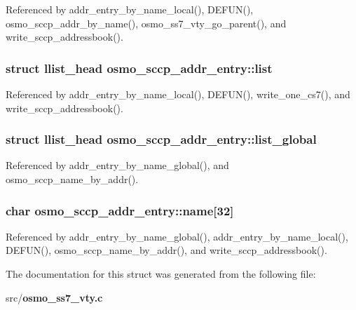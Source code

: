Referenced by addr\+\_\+entry\+\_\+by\+\_\+name\+\_\+local(), D\+E\+F\+U\+N(), osmo\+\_\+sccp\+\_\+addr\+\_\+by\+\_\+name(), osmo\+\_\+ss7\+\_\+vty\+\_\+go\+\_\+parent(), and write\+\_\+sccp\+\_\+addressbook().

\subsubsection[{list}]{\setlength{\rightskip}{0pt plus 5cm}struct llist\+\_\+head osmo\+\_\+sccp\+\_\+addr\+\_\+entry\+::list}\label{structosmo__sccp__addr__entry_a4b37e6e3479ec01f69d9ad791005f8da}


Referenced by addr\+\_\+entry\+\_\+by\+\_\+name\+\_\+local(), D\+E\+F\+U\+N(), write\+\_\+one\+\_\+cs7(), and write\+\_\+sccp\+\_\+addressbook().

\subsubsection[{list\+\_\+global}]{\setlength{\rightskip}{0pt plus 5cm}struct llist\+\_\+head osmo\+\_\+sccp\+\_\+addr\+\_\+entry\+::list\+\_\+global}\label{structosmo__sccp__addr__entry_a8dd093adb27bd599d2b7578aa2c1d615}


Referenced by addr\+\_\+entry\+\_\+by\+\_\+name\+\_\+global(), and osmo\+\_\+sccp\+\_\+name\+\_\+by\+\_\+addr().

\subsubsection[{name}]{\setlength{\rightskip}{0pt plus 5cm}char osmo\+\_\+sccp\+\_\+addr\+\_\+entry\+::name[32]}\label{structosmo__sccp__addr__entry_a20e9fdcbe86f2a18f2a5daabe08f03ff}


Referenced by addr\+\_\+entry\+\_\+by\+\_\+name\+\_\+global(), addr\+\_\+entry\+\_\+by\+\_\+name\+\_\+local(), D\+E\+F\+U\+N(), osmo\+\_\+sccp\+\_\+name\+\_\+by\+\_\+addr(), and write\+\_\+sccp\+\_\+addressbook().



The documentation for this struct was generated from the following file\+:\begin{DoxyCompactItemize}
\item 
src/{\bf osmo\+\_\+ss7\+\_\+vty.\+c}\end{DoxyCompactItemize}
